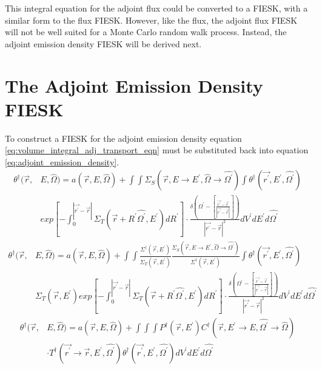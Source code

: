 This integral equation for the adjoint flux could be converted to a FIESK, with
a similar form to the flux FIESK. However, like the flux, the adjoint flux
FIESK will not be well suited for a Monte Carlo random walk process. Instead,
the adjoint emission density FIESK will be derived next.

\section{The Adjoint Emission Density FIESK}
To construct a FIESK for the adjoint emission density equation 
\ref{eq:volume_integral_adj_transport_eqn} must be substituted back into 
equation \ref{eq:adjoint_emission_density}. 
\begin{equation*}
  \begin{split}
    \theta^{\dagger}(\vec{r},&E,\hat{\Omega}) = a(\vec{r},E,\hat{\Omega}) +
    \int\int \Sigma_S(\vec{r},E \to E^{'},\hat{\Omega} \to \hat{\Omega^{'}})
    \int \theta^{\dagger}(\vec{r^{'}},E^{'},\hat{\Omega^{'}}) \\
    & exp\left[-\int_0^{|\vec{r^{'}} - \vec{r}|} 
      \Sigma_T(\vec{r}+R^{'}\hat{\Omega^{'}},E^{'})dR^{'} \right]
    \cdot \frac{\delta \left(\Omega^{'} - \left[\frac{\vec{r^{'}} - \vec{r}}
        {|\vec{r^{'}} - \vec{r}|}\right]\right)}
    {|\vec{r^{'}} - \vec{r}|^2} dV^{'} dE^{'} d\hat{\Omega^{'}}
  \end{split}
\end{equation*}
\begin{equation*}
  \begin{split}
    \theta^{\dagger}(\vec{r},&E,\hat{\Omega}) = a(\vec{r},E,\hat{\Omega}) +
    \int\int \frac{\Sigma^{\dagger}(\vec{r},E^{'})}{\Sigma_T(\vec{r},E^{'})}
    \frac{\Sigma_S(\vec{r},E \to E^{'},\hat{\Omega} \to \hat{\Omega^{'}})}
         {\Sigma^{\dagger}(\vec{r},E^{'})}
    \int \theta^{\dagger}(\vec{r^{'}},E^{'},\hat{\Omega^{'}}) \\
    & \Sigma_T(\vec{r},E^{'}) exp\left[-\int_0^{|\vec{r^{'}} - \vec{r}|} 
      \Sigma_T(\vec{r}+R^{'}\hat{\Omega^{'}},E^{'})dR^{'} \right]
    \cdot \frac{\delta \left(\Omega^{'} - \left[\frac{\vec{r^{'}} - \vec{r}}
        {|\vec{r^{'}} - \vec{r}|}\right]\right)}
    {|\vec{r^{'}} - \vec{r}|^2} dV^{'} dE^{'} d\hat{\Omega^{'}}
  \end{split}
\end{equation*}
\begin{equation}
  \begin{split}
    \theta^{\dagger}(\vec{r},&E,\hat{\Omega}) = a(\vec{r},E,\hat{\Omega}) + 
    \int\int\int P^{\dagger}(\vec{r},E^{'})
    C^{\dagger}(\vec{r},E^{'} \to E,\hat{\Omega^{'}} \to \hat{\Omega}) \\
    & \cdot T^{\dagger}(\vec{r^{'}} \to \vec{r},E^{'},\hat{\Omega^{'}})
    \theta^{\dagger}(\vec{r^{'}},E^{'},\hat{\Omega^{'}})
    dV^{'} dE^{'} d\hat{\Omega^{'}}
  \end{split}
\end{equation}

